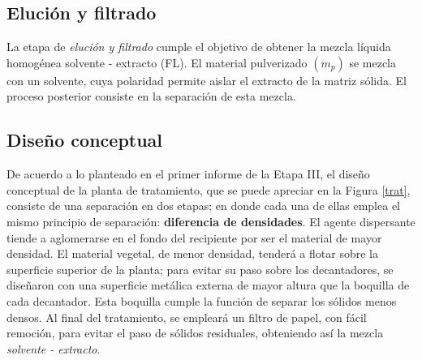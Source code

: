 \begin{center}
	\section{Eluci\'on y filtrado}
\end{center}

\noindent
\justify

La etapa de \textit{eluci\'on y filtrado} cumple el objetivo de obtener la mezcla l\'iquida homog\'enea solvente - extracto (FL). El material pulverizado $\left(m_p \right)$ se mezcla con un solvente, cuya polaridad permite aislar el extracto de la matriz s\'olida. El proceso posterior consiste en la separaci\'on de esta mezcla. 

\subsection{Dise\~no conceptual}

\noindent
\justify

De acuerdo a lo planteado en el primer informe de la Etapa III, el dise\~no conceptual de la planta de tratamiento, que se puede apreciar en la Figura \ref{trat}, consiste de una separaci\'on en dos etapas; en donde cada una de ellas emplea el mismo principio de separaci\'on: \textbf{diferencia de densidades}. El agente dispersante tiende a aglomerarse en el fondo del recipiente por ser el material de mayor densidad. El material vegetal, de menor densidad, tender\'a a flotar sobre la superficie superior de la planta; para evitar su paso sobre los decantadores, se dise\~naron con una superficie met\'alica externa de mayor altura que la boquilla de cada decantador. Esta boquilla cumple la funci\'on de separar los s\'olidos menos densos. Al final del tratamiento, se emplear\'a un filtro de papel, con f\'acil remoci\'on, para evitar el paso de s\'olidos residuales, obteniendo as\'i la mezcla \textit{solvente - extracto}.

